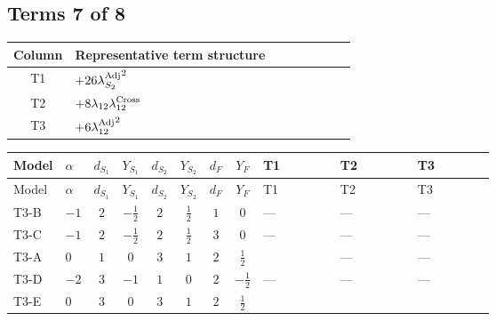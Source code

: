 \documentclass[8pt]{article}
\begin{document}
\begin{landscape}
\subsection*{Terms 7 of 8}
\begin{center}
\begin{tabular}{@{}c >{\raggedright\arraybackslash}p{0.82\linewidth}@{}}
\toprule
Column & Representative term structure \\
\midrule
T1 & \(\displaystyle +26 {\lambda_{S_2}^{\rm Adj}}^2\) \\
\midrule
T2 & \(\displaystyle +8 {\lambda_{12}} {\lambda_{12}^{\rm Cross}}\) \\
\midrule
T3 & \(\displaystyle +6 {\lambda_{12}^{\rm Adj}}^2\) \\
\midrule
\bottomrule
\end{tabular}
\end{center}
\smallskip
\tiny
\begin{longtable}{@{}llcccccc >{\raggedright\arraybackslash}p{0.21\linewidth} >{\raggedright\arraybackslash}p{0.21\linewidth} >{\raggedright\arraybackslash}p{0.21\linewidth}@{}}
\toprule
Model & $\alpha$ & $d_{S_1}$ & $Y_{S_1}$ & $d_{S_2}$ & $Y_{S_2}$ & $d_F$ & $Y_F$ & T1 & T2 & T3 \\
\midrule
\endfirsthead
\toprule
Model & $\alpha$ & $d_{S_1}$ & $Y_{S_1}$ & $d_{S_2}$ & $Y_{S_2}$ & $d_F$ & $Y_F$ & T1 & T2 & T3 \\
\midrule
\endhead
T3-B & $-1$ & $2$ & $-\frac{1}{2}$ & $2$ & $\frac{1}{2}$ & $1$ & $0$ & --- & --- & --- \\
\midrule
T3-C & $-1$ & $2$ & $-\frac{1}{2}$ & $2$ & $\frac{1}{2}$ & $3$ & $0$ & --- & --- & --- \\
\midrule
T3-A & $0$ & $1$ & $0$ & $3$ & $1$ & $2$ & $\frac{1}{2}$ & \scriptsize\adjustbox{max width=\linewidth}{$\begin{gathered} +26 {\lambda_{S_2}^{\rm Adj}}^2\end{gathered}$} & --- & --- \\
\midrule
T3-D & $-2$ & $3$ & $-1$ & $1$ & $0$ & $2$ & $-\frac{1}{2}$ & --- & --- & --- \\
\midrule
T3-E & $0$ & $3$ & $0$ & $3$ & $1$ & $2$ & $\frac{1}{2}$ & \scriptsize\adjustbox{max width=\linewidth}{$\begin{gathered} +26 {\lambda_{S_2}^{\rm Adj}}^2\end{gathered}$} & \scriptsize\adjustbox{max width=\linewidth}{$\begin{gathered} +8 {\lambda_{12}} {\lambda_{12}^{\rm Cross}}\end{gathered}$} & \scriptsize\adjustbox{max width=\linewidth}{$\begin{gathered} +6 {\lambda_{12}^{\rm Adj}}^2\end{gathered}$} \\
\midrule
\bottomrule
\end{longtable}
\clearpage

\end{landscape}
\end{document}
